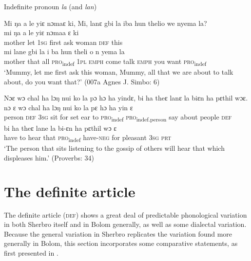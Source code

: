 \ea%
    \label{ex:70}
    Indefinite pronoun \textit{la} (and \textit{lan})
    
    \ea \label{ex:70a} Mi ŋa a le yiɛ nɔmaɛ ki, Mi, lanɛ gbi la iba hun thelio we nyema la?\\
    \gll mi      ŋa    a    le    yiɛ    nɔmaa  ɛ    ki\\
    mother  let    \textsc{1sg}  first  ask  woman  \textsc{def}  this\\
  \gll mi        lane  gbi  la      i    ba      hun  theli  o      n    yema    la\\
  mother    that  all    \textsc{pro}\textsubscript{indef}  \textsc{1pl}  \textsc{emph}    come  talk  \textsc{emph}    you  want    \textsc{pro}\textsubscript{indef}\\
\glt ‘Mummy, let me first ask this woman, Mummy, all that we are about to talk about, do you want that?' (007a Agnes J. Simbo: 6)

\ex \label{ex:70b} Nɔɛ wɔ chal ha lɔŋ nui ko la pɔ hɔ ha yindɛ, bi ha theɛ lanɛ la biɛn ha pɛthil wɔɛ.\\
\gll nɔ      ɛ    wɔ    chal  ha    lɔŋ  nui  ko  la      pɛ          hɔ    ha    yin    ɛ\\
person  \textsc{def}  \textsc{3sg}   sit    for    set    ear  to  \textsc{pro}\textsubscript{indef}  \textsc{pro}\textsubscript{indef.person}  say  about  people  \textsc{def}\\
\gll bi    ha    theɛ  lane  la      bi-ɛn      ha      pɛthil      wɔ    ɛ\\
have  to    hear  that  \textsc{pro}\textsubscript{indef}  have-\textsc{neg}  for       pleasant    \textsc{3sg}  \textsc{prt}\\
\glt ‘The person that sits listening to the gossip of others will hear that which displeases him.' (Proverbs: 34)
\z
\z

\section{The definite article} \label{sec:3.4}\hypertarget{Toc115517768}{}
The definite article (\textsc{def}) shows a great deal of predictable phonological variation in both Sherbro itself and in Bolom generally, as well as some dialectal variation. Because the general variation in Sherbro replicates the variation found more generally in Bolom, this section incorporates some comparative statements, as first presented in \citet{Childs2016}.

